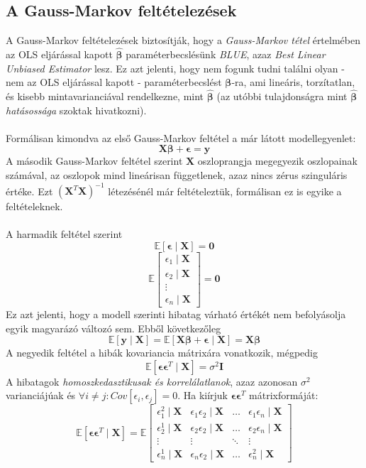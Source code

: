 \documentclass[14p]{report}
\def\pmb{\boldsymbol}
\def\ebeta{\hat{\pmb{\beta}}}
\def\e{\epsilon}
\begin{document}
	\subsection{A Gauss-Markov feltételezések}
	A Gauss-Markov feltételezések biztosítják, hogy a \emph{Gauss-Markov tétel} értelmében az OLS eljárással kapott $\ebeta$ paraméterbecslésünk \emph{BLUE}, azaz \emph{Best Linear Unbiased Estimator} lesz. Ez azt jelenti, hogy nem fogunk tudni találni olyan - nem az OLS eljárással kapott - paraméterbecslést $\pmb{\beta}$-ra, ami lineáris, torzítatlan, és kisebb mintavarianciával rendelkezne, mint $\ebeta$ (az utóbbi tulajdonságra mint $\ebeta$ \emph{hatásossága} szoktak hivatkozni).
	\\
	\\ 
	Formálisan kimondva az első Gauss-Markov feltétel a már látott modellegyenlet:
	\[
	\pmb{X}\pmb{\beta} + \pmb{\e} = \pmb{y}
	\]
	A második Gauss-Markov feltétel szerint $\pmb{X}$ oszloprangja megegyezik oszlopainak számával, az oszlopok mind lineárisan függetlenek, azaz nincs zérus szinguláris értéke. Ezt $(\pmb{X}^T\pmb{X})^{-1}$ létezésénél már feltételeztük, formálisan ez is egyike a feltételeknek.
	\\
	\\
	A harmadik feltétel szerint
	\[
	\mathbb{E}[\pmb{\e} \mid \pmb{X}] = \pmb{0}
	\]
	\[
	\mathbb{E}
	\begin{bmatrix}
		\e_1 \mid \pmb{X} \\
		\e_2 \mid \pmb{X} \\
		\vdots \\
		\e_n \mid \pmb{X}
	\end{bmatrix}
	= \pmb{0}
	\]
	Ez azt jelenti, hogy a modell szerinti hibatag várható értékét nem befolyásolja egyik magyarázó változó sem. Ebből következőleg
	\[
	\mathbb{E}[\pmb{y} \mid \pmb{X}] = \mathbb{E}[\pmb{X}\pmb{\beta} + \pmb{\e} \mid \pmb{X}] = \pmb{X}\pmb{\beta}
	\]
	A negyedik feltétel a hibák kovariancia mátrixára vonatkozik, mégpedig
	\[
	\mathbb{E}[\pmb{\e}\pmb{\e}^T \mid \pmb{X}] = \sigma^2\pmb{I}
	\]
	A hibatagok \emph{homoszkedasztikusak és korrelálatlanok}, azaz azonosan $\sigma^2$ varianciájúak és $\forall i \ne j : Cov[\e_i, \e_j] = 0$. Ha kiírjuk $\pmb{\e}\pmb{\e}^T$ mátrixformáját:
	\[
	\mathbb{E}[\pmb{\e}\pmb{\e}^T \mid \pmb{X}] =
	\mathbb{E}
	\begin{bmatrix}
		\e_1^2 \mid \pmb{X} & \e_1 \e_2 \mid \pmb{X} & \dots & \e_1 \e_n \mid \pmb{X} \\
		\e_2^1 \mid \pmb{X} & \e_2 \e_2 \mid \pmb{X} & \dots & \e_2 \e_n \mid \pmb{X} \\
		\vdots & \vdots & \ddots & \vdots \\
		\e_n^1 \mid \pmb{X} & \e_n \e_2 \mid \pmb{X} & \dots & \e_n^2 \mid \pmb{X}
	\end{bmatrix}
	\]
\end{document}
